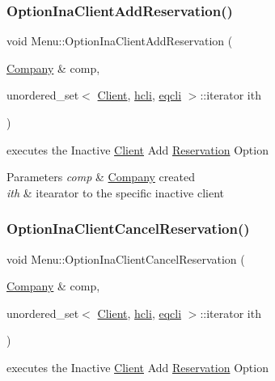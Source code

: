 \subsubsection{\texorpdfstring{Option\+Ina\+Client\+Add\+Reservation()}{OptionInaClientAddReservation()}}
{\footnotesize\ttfamily void Menu\+::\+Option\+Ina\+Client\+Add\+Reservation (\begin{DoxyParamCaption}\item[{\hyperlink{class_company}{Company} \&}]{comp,  }\item[{unordered\+\_\+set$<$ \hyperlink{class_client}{Client}, \hyperlink{structhcli}{hcli}, \hyperlink{structeqcli}{eqcli} $>$\+::iterator}]{ith }\end{DoxyParamCaption})}



executes the Inactive \hyperlink{class_client}{Client} Add \hyperlink{class_reservation}{Reservation} Option 


\begin{DoxyParams}{Parameters}
{\em comp} & \hyperlink{class_company}{Company} created\\
\hline
{\em ith} & itearator to the specific inactive client \\
\hline
\end{DoxyParams}
\hypertarget{class_menu_a9926ac704596d4b58f9e052eb2b972c7}{}\label{class_menu_a9926ac704596d4b58f9e052eb2b972c7} 
\subsubsection{\texorpdfstring{Option\+Ina\+Client\+Cancel\+Reservation()}{OptionInaClientCancelReservation()}}
{\footnotesize\ttfamily void Menu\+::\+Option\+Ina\+Client\+Cancel\+Reservation (\begin{DoxyParamCaption}\item[{\hyperlink{class_company}{Company} \&}]{comp,  }\item[{unordered\+\_\+set$<$ \hyperlink{class_client}{Client}, \hyperlink{structhcli}{hcli}, \hyperlink{structeqcli}{eqcli} $>$\+::iterator}]{ith }\end{DoxyParamCaption})}



executes the Inactive \hyperlink{class_client}{Client} Add \hyperlink{class_reservation}{Reservation} Option 


